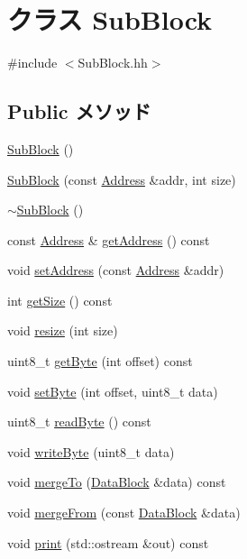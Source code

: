 \hypertarget{classSubBlock}{
\section{クラス SubBlock}
\label{classSubBlock}
}


{\ttfamily \#include $<$SubBlock.hh$>$}\subsection*{Public メソッド}
\begin{DoxyCompactItemize}
\item 
\hyperlink{classSubBlock_ae185d3db5809c94218aeb10e88f4d549}{SubBlock} ()
\item 
\hyperlink{classSubBlock_a51e22821bb29b1f6c680af41d805f562}{SubBlock} (const \hyperlink{classAddress}{Address} \&addr, int size)
\item 
\hyperlink{classSubBlock_a8cf1f79e8bf95f0e2cc010d7768bb7ed}{$\sim$SubBlock} ()
\item 
const \hyperlink{classAddress}{Address} \& \hyperlink{classSubBlock_aca15ef966561def0b4db75a6f7e085b6}{getAddress} () const 
\item 
void \hyperlink{classSubBlock_a53120b1754f27e405338f9ab6e3408cc}{setAddress} (const \hyperlink{classAddress}{Address} \&addr)
\item 
int \hyperlink{classSubBlock_a4f8dbb76319fe40792867d6ca51ef447}{getSize} () const 
\item 
void \hyperlink{classSubBlock_ada388d17b93c54a1a0f6edddbe0953ab}{resize} (int size)
\item 
uint8\_\-t \hyperlink{classSubBlock_a70e6dc2ffdce33da348b9bd615061820}{getByte} (int offset) const 
\item 
void \hyperlink{classSubBlock_a53ae5d405294f20035f269ab2e1c1748}{setByte} (int offset, uint8\_\-t data)
\item 
uint8\_\-t \hyperlink{classSubBlock_a73bc50a98a59ca5140e127763a1a445e}{readByte} () const 
\item 
void \hyperlink{classSubBlock_a1c4230046f3ab5a24fed43cb939ddb18}{writeByte} (uint8\_\-t data)
\item 
void \hyperlink{classSubBlock_a1be9f3fe77e022deeff58486e2db9e69}{mergeTo} (\hyperlink{classDataBlock}{DataBlock} \&data) const 
\item 
void \hyperlink{classSubBlock_acffc0dafa5d2a064a523dff40070ed36}{mergeFrom} (const \hyperlink{classDataBlock}{DataBlock} \&data)
\item 
void \hyperlink{classSubBlock_ac55fe386a101fbae38c716067c9966a0}{print} (std::ostream \&out) const 
\end{DoxyCompactItemize}
